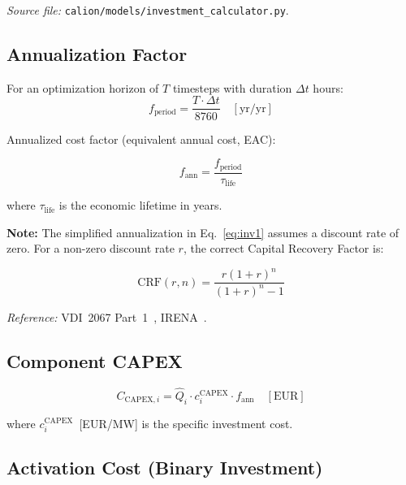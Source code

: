 \documentclass[a4paper,12pt]{article}
\newcommand{\CRF}{\mathrm{CRF}}
\begin{document}
\textit{Source file:} \texttt{calion/models/investment\_calculator.py}.

\subsection{Annualization Factor}

For an optimization horizon of $T$ timesteps with duration $\Delta t$ hours:
\[
  f_{\text{period}} = \frac{T \cdot \Delta t}{8760} \quad [\text{yr/yr}]
\]

Annualized cost factor (equivalent annual cost, EAC):

\begin{equation}
  f_{\text{ann}} = \frac{f_{\text{period}}}{\tau_{\text{life}}}
  \tag{INV-1}
  \label{eq:inv1}
\end{equation}

where $\tau_{\text{life}}$ is the economic lifetime in years.

\noindent\textbf{Note:} The simplified annualization in Eq.~\eqref{eq:inv1} assumes a
discount rate of zero. For a non-zero discount rate $r$, the correct Capital Recovery Factor
is:

\begin{equation}
  \CRF(r, n) = \frac{r(1+r)^{n}}{(1+r)^{n} - 1}
  \tag{INV-2}
  \label{eq:crf}
\end{equation}

\noindent\textit{Reference:} VDI~2067 Part~1~\cite{VDI2067}, IRENA~\cite{IRENA2020}.

\subsection{Component CAPEX}

\begin{equation}
  C_{\text{CAPEX},i}
  = \hat{Q}_{i} \cdot c^{\text{CAPEX}}_{i} \cdot f_{\text{ann}}
  \quad [\text{EUR}]
  \tag{INV-3}
  \label{eq:inv3}
\end{equation}

where $c^{\text{CAPEX}}_{i}$~[EUR/MW] is the specific investment cost.

\subsection{Activation Cost (Binary Investment)}
\end{document}
